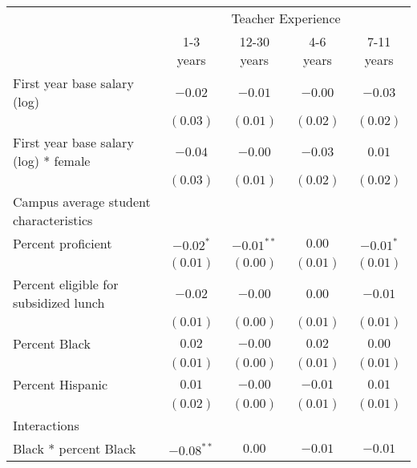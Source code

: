 \documentclass[]{article}
\begin{document}
\begin{table}
\begin{center}
\begin{tabular}{l c c c c }
\hline
 & \multicolumn{4}{c}{Teacher Experience} \\ \cline{2-5}
 & 1-3 years & 12-30 years & 4-6 years & 7-11 years \\
\hline
First year base salary (log)                & $-0.02$      & $-0.01$      & $-0.00$      & $-0.03$       \\
                                            & $(0.03)$     & $(0.01)$     & $(0.02)$     & $(0.02)$      \\
First year base salary (log) * female       & $-0.04$      & $-0.00$      & $-0.03$      & $0.01$        \\
                                            & $(0.03)$     & $(0.01)$     & $(0.02)$     & $(0.02)$      \\
Campus average student characteristics      &              &              &              &               \\
\quad Percent proficient                    & $-0.02^{*}$  & $-0.01^{**}$ & $0.00$       & $-0.01^{*}$   \\
                                            & $(0.01)$     & $(0.00)$     & $(0.01)$     & $(0.01)$      \\
\quad Percent eligible for subsidized lunch & $-0.02$      & $-0.00$      & $0.00$       & $-0.01$       \\
                                            & $(0.01)$     & $(0.00)$     & $(0.01)$     & $(0.01)$      \\
\quad Percent Black                         & $0.02$       & $-0.00$      & $0.02$       & $0.00$        \\
                                            & $(0.01)$     & $(0.00)$     & $(0.01)$     & $(0.01)$      \\
\quad Percent Hispanic                      & $0.01$       & $-0.00$      & $-0.01$      & $0.01$        \\
                                            & $(0.02)$     & $(0.00)$     & $(0.01)$     & $(0.01)$      \\
Interactions                                &              &              &              &               \\
\quad Black * percent Black                 & $-0.08^{**}$ & $0.00$       & $-0.01$      & $-0.01$       \\

\end{tabular}
\end{center}
\end{table}
\end{document}
